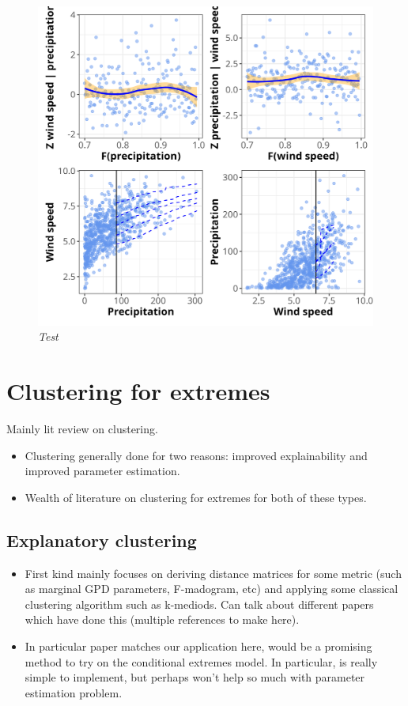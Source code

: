 \documentclass{article}
\numberwithin{equation}{section}
\begin{document}
\begin{figure}[H]
    \centering
    \includegraphics[width = 0.9\linewidth]{plots/048_diag.png}
    \caption{\emph{Test}}
    \label{fig:04_diag}
\end{figure}


\newpage
\section{Clustering for extremes}\label{sec:clustering}

Mainly lit review on clustering. 
\begin{itemize}
  \item Clustering generally done for two reasons: improved explainability and improved parameter estimation. 
  \item Wealth of literature on clustering for extremes for both of these types. 
\end{itemize}

\subsection{Explanatory clustering}

\begin{itemize}
  \item First kind mainly focuses on deriving distance matrices for some metric (such as marginal GPD parameters, F-madogram, etc) and applying some classical clustering algorithm such as k-mediods. Can talk about different papers which have done this (multiple references to make here).
  \item In particular \cite{Vignotto2021} paper matches our application here, would be a promising method to try on the conditional extremes model. In particular, is really simple to implement, but perhaps won't help so much with parameter estimation problem. 
\end{itemize}
\end{document}
